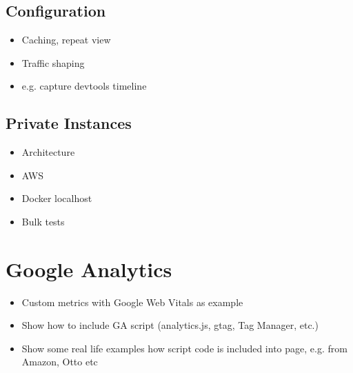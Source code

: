 \subsection{Configuration}


\begin{itemize}
\item Caching, repeat view
\item Traffic shaping
\item e.g. capture devtools timeline
\end{itemize}



\subsection{Private Instances}


\begin{itemize}
\item Architecture
\item AWS
\item Docker localhost
\item Bulk tests
\end{itemize}












\section{Google Analytics}

\begin{itemize}
    \item Custom metrics with Google Web Vitals as example
    \item Show how to include GA script (analytics.js, gtag, Tag Manager, etc.)
    \item Show some real life examples how script code is included into page, e.g. from Amazon, Otto etc
\end{itemize}



